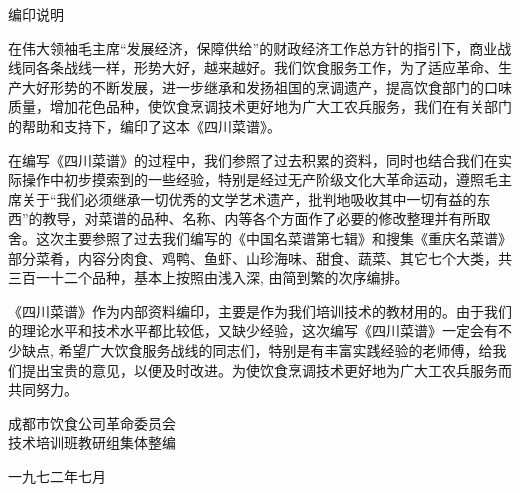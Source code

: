 \begin{center}
\Large
编印说明
\end{center}

在伟大领袖毛主席{\sffamily“发展经济，保障供给”}的财政经济工作总方针的指引下，商业战线同各条战线一样，形势大好，越来越好。我们饮食服务工作，为了适应革命、生产大好形势的不断发展，进一步继承和发扬祖国的烹调遗产，提高饮食部门的口味质量，增加花色品种，使饮食烹调技术更好地为广大工农兵服务，我们在有关部门的帮助和支持下，编印了这本《四川菜谱》。

在编写《四川菜谱》的过程中，我们参照了过去积累的资料，同时也结合我们在实际操作中初步摸索到的一些经验，特别是经过无产阶级文化大革命运动，遵照毛主席关于{\sffamily“我们必须继承一切优秀的文学艺术遗产，批判地吸收其中一切有益的东西”}的教导，对菜谱的品种、名称、内等各个方面作了必要的修改整理并有所取舍。这次主要参照了过去我们编写的《中国名菜谱第七辑》和搜集《重庆名菜谱》部分菜肴，内容分肉食、鸡鸭、鱼虾、山珍海味、甜食、蔬菜、其它七个大类，共三百一十二个品种，基本上按照由浅入深, 由简到繁的次序编排。

《四川菜谱》作为内部资料编印，主要是作为我们培训技术的教材用的。由于我们的理论水平和技术水平都比较低，又缺少经验，这次编写《四川菜谱》一定会有不少缺点, 希望广大饮食服务战线的同志们，特别是有丰富实践经验的老师傅，给我们提出宝贵的意见，以便及时改进。为使饮食烹调技术更好地为广大工农兵服务而共同努力。

\begin{flushright}
成都市饮食公司革命委员会\\
技术培训班教研组集体整编

一九七二年七月
\end{flushright}

